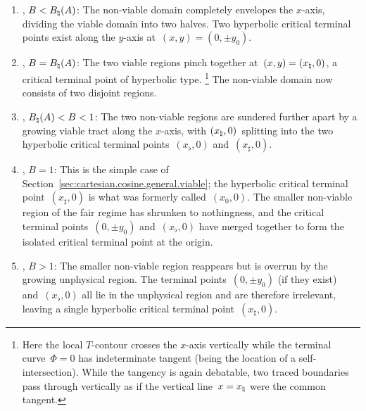 \begin{enumerate}
  \item
    \label{itm:cartesian.cosine.general.regimes.gentle}
    , $B < B_\natural (A)$:
    The non-viable domain completely envelopes the $x$-axis,
    dividing the viable domain into two halves.
    Two hyperbolic critical terminal points exist along the $y$-axis
    at~$(x, y) = (0, \pm y_0)$.
  \item
    \label{itm:cartesian.cosine.general.regimes.gentle-to-fair}
    , $B = B_\natural (A)$:
    The two viable regions pinch together at~$(x, y) = (x_\natural, 0)$,
    a critical terminal point of hyperbolic type.%
    \footnote{
      Here the local $T$-contour crosses the $x$-axis vertically
      while the terminal curve~$\Phi = 0$ has indeterminate tangent
      (being the location of a self-intersection).
      While the tangency is again debatable,
      two traced boundaries pass through vertically
      as if the vertical line~$x = x_\natural$ were the common tangent.
    }
    The non-viable domain now consists of two disjoint regions.
  \item
    \label{itm:cartesian.cosine.general.regimes.fair}
    , $B_\natural (A) < B < 1$:
    The two non-viable regions are sundered further apart
    by a growing viable tract along the $x$-axis,
    with $(x_\natural, 0)$~splitting into the two
    hyperbolic critical terminal points~$(x_\flat, 0)$ and~$(x_\sharp, 0)$.
  \item
    \label{itm:cartesian.cosine.general.regimes.fair-to-steep}
    , $B = 1$:
    This is the simple case
    of Section~\ref{sec:cartesian.cosine.general.viable};
    the hyperbolic critical terminal point~$(x_\sharp, 0)$
    is what was formerly called~$(x_0, 0)$.
    The smaller non-viable region of the fair regime
    has shrunken to nothingness,
    and the critical terminal points~$(0, \pm y_0)$ and~$(x_\flat, 0)$
    have merged together
    to form the isolated critical terminal point at the origin.
  \item
    \label{itm:cartesian.cosine.general.regimes.steep}
    , $B > 1$:
    The smaller non-viable region
    reappears but is overrun by the growing unphysical region.
    The terminal points~$(0, \pm y_0)$ (if they exist)
    and~$(x_\flat, 0)$ all lie in the unphysical region
    and are therefore irrelevant,
    leaving a single hyperbolic critical terminal point~$(x_\sharp, 0)$.
\end{enumerate}


